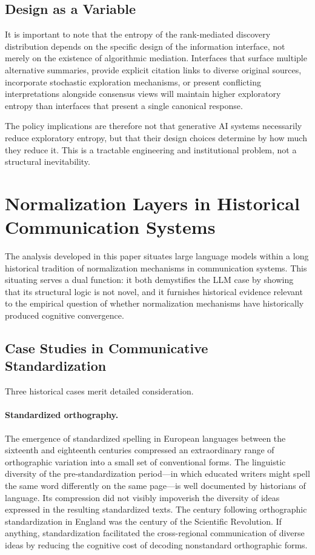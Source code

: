 \documentclass[12pt,a4paper]{article}
\theoremstyle{definition}
\theoremstyle{plain}
\theoremstyle{remark}
\begin{document}
\subsection{Design as a Variable}

It is important to note that the entropy of the rank-mediated discovery distribution depends
on the specific design of the information interface, not merely on the existence of
algorithmic mediation. Interfaces that surface multiple alternative summaries, provide
explicit citation links to diverse original sources, incorporate stochastic exploration
mechanisms, or present conflicting interpretations alongside consensus views will maintain
higher exploratory entropy than interfaces that present a single canonical response.

The policy implications are therefore not that generative AI systems necessarily reduce
exploratory entropy, but that their design choices determine by how much they reduce it.
This is a tractable engineering and institutional problem, not a structural inevitability.

\section{Normalization Layers in Historical Communication Systems}
\label{sec:historical}

The analysis developed in this paper situates large language models within a long historical
tradition of normalization mechanisms in communication systems. This situating serves a dual
function: it both demystifies the LLM case by showing that its structural logic is not
novel, and it furnishes historical evidence relevant to the empirical question of whether
normalization mechanisms have historically produced cognitive convergence.

\subsection{Case Studies in Communicative Standardization}

Three historical cases merit detailed consideration.

\paragraph{Standardized orthography.} The emergence of standardized spelling in European
languages between the sixteenth and eighteenth centuries compressed an extraordinary range of
orthographic variation into a small set of conventional forms. The linguistic diversity of
the pre-standardization period---in which educated writers might spell the same word
differently on the same page---is well documented by historians of language. Its compression
did not visibly impoverish the diversity of ideas expressed in the resulting standardized
texts. The century following orthographic standardization in England was the century of the
Scientific Revolution. If anything, standardization facilitated the cross-regional
communication of diverse ideas by reducing the cognitive cost of decoding nonstandard
orthographic forms.
\end{document}
